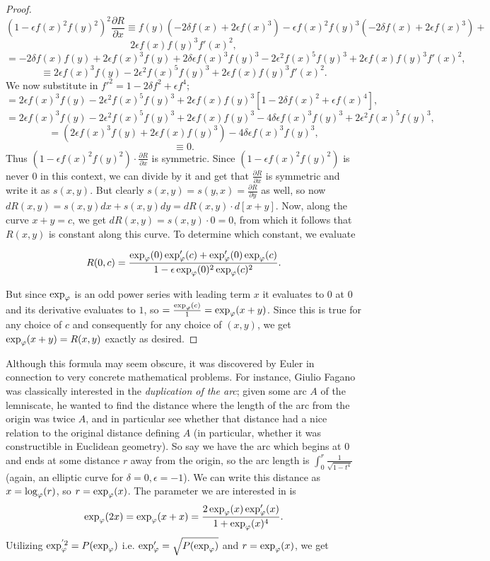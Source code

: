 \begin{proof}
\[(1 - \epsilon f(x)^2 f(y)^2)^2 \frac{\partial R}{\partial x} \equiv f(y)(-2 \delta f(x) + 2 \epsilon f(x)^3)  - \epsilon f(x)^2 f(y)^3 (-2 \delta f(x) + 2 \epsilon f(x)^3) +\]
\[   2 \epsilon f(x) f(y)^3 f'(x)^2 ,\]
\[ = -2 \delta f(x) f(y) + 2 \epsilon f(x)^3 f(y) + 2 \delta \epsilon f(x)^3 f(y)^3 - 2 \epsilon^2 f(x)^5 f(y)^3 + 2 \epsilon f(x) f(y)^3 f'(x)^2 ,\]
\[ \equiv 2 \epsilon f(x)^3 f(y) - 2 \epsilon^2 f(x)^5 f(y)^3 + 2 \epsilon f(x) f(y)^3 f'(x)^2  .\]
We now substitute in $f'^2 = 1 - 2 \delta f^2 + \epsilon f^4$;
\[ =  2 \epsilon f(x)^3 f(y) - 2 \epsilon^2 f(x)^5 f(y)^3 + 2 \epsilon f(x) f(y)^3 [1 - 2 \delta f(x)^2 + \epsilon f(x)^4]  , \]
\[ =  2 \epsilon f(x)^3 f(y) - 2 \epsilon^2 f(x)^5 f(y)^3  +  2 \epsilon f(x) f(y)^3  - 4 \delta \epsilon f(x)^3 f(y)^3 + 2\epsilon^2 f(x)^5 f(y)^3, \]
\[ = (2 \epsilon f(x)^3 f(y)  +  2 \epsilon f(x) f(y)^3  ) - 4 \delta \epsilon f(x)^3 f(y)^3 ,\]
\[ \equiv 0.\]
Thus $(1 - \epsilon f(x)^2 f(y)^2) \cdot \frac{\partial R}{\partial x}$ is symmetric. Since $(1 - \epsilon f(x)^2 f(y)^2) $ is never $0$ in this context, we can divide by it and get that $\frac{\partial R}{\partial x}$ is symmetric and write it as $s(x, y)$. But clearly $s(x, y) = s(y, x) = \frac{\partial R}{\partial y}$ as well, so now $dR(x, y) = s(x, y) dx + s(x, y) dy = dR(x, y) \cdot d[x + y]$. Now, along the curve $x + y = c$, we get $dR(x, y) = s(x, y) \cdot 0 = 0$, from which it follows that $R(x, y)$ is constant along this curve. To determine which constant, we evaluate

\[R(0, c) =  \frac{\exp_\varphi (0) \exp_\varphi' (c) + \exp_\varphi' (0) \exp_\varphi (c)    }{1 - \epsilon \exp_\varphi (0)^2 \exp_\varphi (c)^2  } .\]

But since $\exp_\varphi$ is an odd power series with leading term $x$ it evaluates to $0$ at $0$ and its derivative evaluates to $1$, so $ = \frac{\exp_\varphi (c)}{1} = \exp_\varphi (x + y)$. Since this is true for any choice of $c$ and consequently for any choice of $(x, y)$, we get $\exp_\varphi (x + y) = R(x, y)$ exactly as desired.
\end{proof}

Although this formula may seem obscure, it was discovered by Euler in connection to very concrete mathematical problems. For instance, Giulio Fagano was classically interested in the \textit{duplication of the arc}; given some arc $A$ of the lemniscate, he wanted to find the distance where the length of the arc from the origin was twice $A$, and in particular see whether that distance had a nice relation to the original distance defining $A$ (in particular, whether it was constructible in Euclidean geometry). So say we have the arc which begins at $0$ and ends at some distance $r$ away from the origin, so the arc length is $\int_0^r \frac{1}{\sqrt{1 - t^4}}$  (again, an elliptic curve for $\delta = 0, \epsilon = -1$). We can write this distance as $x = \log_\varphi (r)$, so $r = \exp_\varphi (x)$. The parameter we are interested in is 
\[\exp_\varphi (2x) = \exp_\varphi (x + x) = \frac{2\exp_\varphi(x) \exp_\varphi'(x)}{1 + \exp_\varphi(x)^4}.\]
Utilizing $\exp^{'2}_\varphi = P(\exp_\varphi)$ i.e. $\exp'_\varphi = \sqrt{P(\exp_\varphi)}$ and $r = \exp_\varphi (x)$, we get

